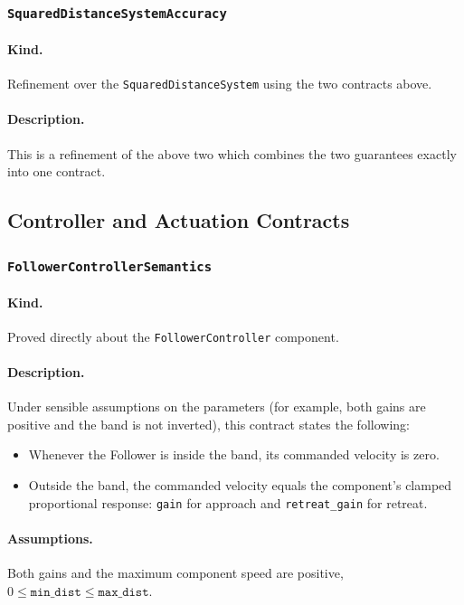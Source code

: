\documentclass{article}
\begin{document}
\subsubsection{\texttt{SquaredDistanceSystemAccuracy}}

\paragraph{Kind.} Refinement over the \texttt{SquaredDistanceSystem} using the two contracts above.

\paragraph{Description.} This is a refinement of the above two which combines the two guarantees exactly into one contract. 

\subsection{Controller and Actuation Contracts}

\subsubsection{\texttt{FollowerControllerSemantics}}

\paragraph{Kind.} Proved directly about the \texttt{FollowerController} component.

\paragraph{Description.} Under sensible assumptions on the parameters (for example, both gains are positive and the band is not inverted), this contract states the following:
\begin{itemize}
    \item Whenever the Follower is inside the band, its commanded velocity is zero.
    \item Outside the band, the commanded velocity equals the component's clamped proportional response: \texttt{gain} for approach and \texttt{retreat\_gain} for retreat.
\end{itemize}

\paragraph{Assumptions.} Both gains and the maximum component speed are
positive, $0 \leq \texttt{min\_dist} \leq \texttt{max\_dist}$.
\end{document}
